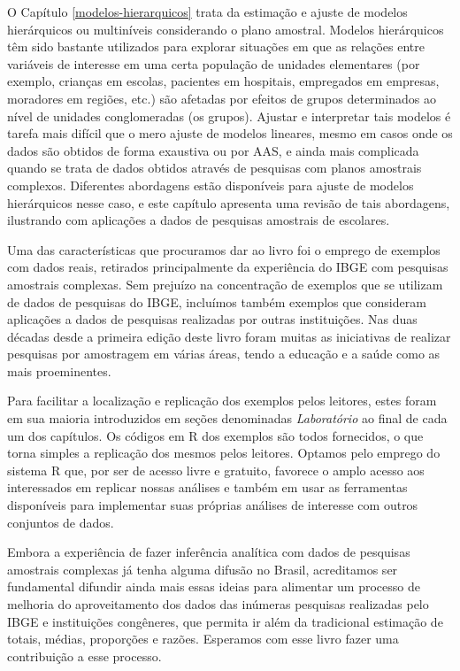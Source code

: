 \documentclass[
  12pt,
  brazilian,
]{book}
\theoremstyle{definition}
\theoremstyle{definition}
\theoremstyle{definition}
\theoremstyle{definition}
\theoremstyle{remark}
\begin{document}
O Capítulo \ref{modelos-hierarquicos} trata da estimação e ajuste de modelos hierárquicos ou multiníveis considerando o plano amostral. Modelos hierárquicos têm sido bastante utilizados para explorar situações em que as relações entre variáveis de interesse em uma certa população de unidades elementares (por exemplo, crianças em escolas, pacientes em hospitais, empregados em empresas, moradores em regiões, etc.) são afetadas por efeitos de grupos determinados ao nível de unidades conglomeradas (os grupos). Ajustar e interpretar tais modelos é tarefa mais difícil que o mero ajuste de modelos lineares, mesmo em casos onde os dados são obtidos de forma exaustiva ou por AAS, e ainda mais complicada quando se trata de dados obtidos através de pesquisas com planos amostrais complexos. Diferentes abordagens estão disponíveis para ajuste de modelos hierárquicos nesse caso, e este capítulo apresenta uma revisão de tais abordagens, ilustrando com aplicações a dados de pesquisas amostrais de escolares.

Uma das características que procuramos dar ao livro foi o emprego de exemplos com dados reais, retirados principalmente da experiência do IBGE com pesquisas amostrais complexas. Sem prejuízo na concentração de exemplos que se utilizam de dados de pesquisas do IBGE, incluímos também exemplos que consideram aplicações a dados de pesquisas realizadas por outras instituições. Nas duas décadas desde a primeira edição deste livro foram muitas as iniciativas de realizar pesquisas por amostragem em várias áreas, tendo a educação e a saúde como as mais proeminentes.

Para facilitar a localização e replicação dos exemplos pelos leitores, estes foram em sua maioria introduzidos em seções denominadas \emph{Laboratório} ao final de cada um dos capítulos. Os códigos em R dos exemplos são todos fornecidos, o que torna simples a replicação dos mesmos pelos leitores. Optamos pelo emprego do sistema R que, por ser de acesso livre e gratuito, favorece o amplo acesso aos interessados em replicar nossas análises e também em usar as ferramentas disponíveis para implementar suas próprias análises de interesse com outros conjuntos de dados.

Embora a experiência de fazer inferência analítica com dados de pesquisas amostrais complexas já tenha alguma difusão no Brasil, acreditamos ser fundamental difundir ainda mais essas ideias para alimentar um processo de melhoria do aproveitamento dos dados das inúmeras pesquisas realizadas pelo IBGE e instituições congêneres, que permita ir além da tradicional estimação de totais, médias, proporções e razões. Esperamos com esse livro fazer uma contribuição a esse processo.
\end{document}
